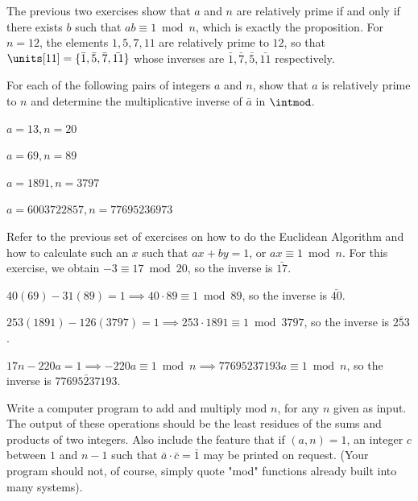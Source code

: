 \begin{problems}
    \begin{sol}
        The previous two exercises show that $a$ and $n$ are relatively prime if and only if there exists $b$ such that $ab \equiv 1 \bmod n$, which is exactly the proposition. For $n = 12$, the elements $1, 5, 7, 11$ are relatively prime to $12$, so that $\units[11] = \{\bar 1, \bar 5, \bar 7, \bar{11}\} $ whose inverses are $\bar 1, \bar 7, \bar 5, \bar{11}$ respectively. 
    \end{sol}
    \item For each of the following pairs of integers $a$ and $n$, show that $a$ is relatively prime to $n$ and determine the multiplicative inverse of $\bar a$ in $\intmod$.
    \begin{problems}
        \item $a = 13, n = 20$
        \item $a = 69, n = 89$
        \item $a = 1891, n = 3797$
        \item $a = 6003722857, n = 77695236973$
    \end{problems}
    \begin{solalph}
        \item Refer to the previous set of exercises on how to do the Euclidean Algorithm and how to calculate such an $x$ such that $ax + by = 1$, or $ax \equiv 1 \bmod n$. For this exercise, we obtain $-3 \equiv 17 \bmod 20$, so the inverse is $\bar{17}$.
        \item $40(69) - 31(89) = 1 \implies 40\cdot 89 \equiv 1 \bmod 89$, so the inverse is $\bar{40}$.
        \item $253(1891) - 126(3797) = 1 \implies 253 \cdot 1891 \equiv 1 \bmod 3797$, so the inverse is $\bar{253}$.
        \item $17n - 220a = 1 \implies -220a \equiv 1 \bmod n \implies 77695237193a \equiv 1 \bmod n$, so the inverse is $\bar{77695237193}$.
    \end{solalph}
    \item Write a computer program to add and multiply mod $n$, for any $n$ given as input. The output of these operations should be the least residues of the sums and products of two integers. Also include the feature that if $(a, n) = 1$, an integer $c$ between $1$ and $n - 1$ such that $\bar a \cdot \bar c = \bar 1$ may be printed on request. (Your program should not, of course, simply quote "mod" functions already built into many systems).
    \begin{sol}


\end{sol}
\end{problems}

